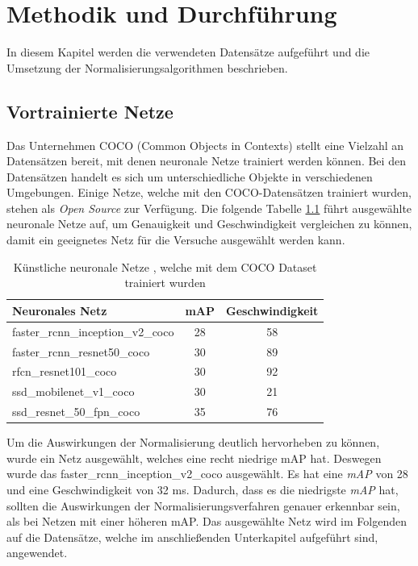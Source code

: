 \chapter{Methodik und Durchführung}\label{s.methudurchf}
In diesem Kapitel werden die verwendeten Datensätze aufgeführt und die Umsetzung der Normalisierungsalgorithmen beschrieben.  
 \section{Vortrainierte Netze}\label{s.modell}
Das Unternehmen COCO \cite{common2018data} (Common Objects in Contexts) stellt eine Vielzahl an Datensätzen bereit, mit denen neuronale Netze trainiert werden können. Bei den Datensätzen handelt es sich um unterschiedliche Objekte in verschiedenen Umgebungen.  
Einige Netze, welche mit den COCO-Datensätzen trainiert wurden, stehen als \textit{Open Source} zur Verfügung. Die folgende Tabelle \ref{tab:cocomodels} führt ausgewählte neuronale Netze auf, um Genauigkeit und Geschwindigkeit vergleichen zu können, damit ein geeignetes Netz für die Versuche ausgewählt werden kann.
\begin{table}
[h]
\caption{Künstliche neuronale Netze \cite{google2018tens}, welche mit dem COCO Dataset trainiert wurden \cite{common2018data}} 
\label{tab:cocomodels}
\centering
\begin{tabular}{|l|c|c|}
\hline
Neuronales Netz & mAP & Geschwindigkeit\\
\hline
faster\_rcnn\_inception\_v2\_coco & 28 & 58\\
faster\_rcnn\_resnet50\_coco & 30 & 89\\
rfcn\_resnet101\_coco & 30 & 92\\
ssd\_mobilenet\_v1\_coco & 30 & 21\\
ssd\_resnet\_50\_fpn\_coco & 35 & 76\\
\hline
\end{tabular}
\end{table}
Um die Auswirkungen der Normalisierung deutlich hervorheben zu können, wurde ein Netz ausgewählt, welches eine recht niedrige mAP hat. Deswegen wurde das faster\_rcnn\_inception\_v2\_coco ausgewählt. Es hat eine \textit{mAP} von 28 und eine Geschwindigkeit von 32 ms. Dadurch, dass es die niedrigste \textit{mAP} hat, sollten die Auswirkungen der Normalisierungsverfahren genauer erkennbar sein, als bei Netzen mit einer höheren mAP. Das ausgewählte Netz wird im Folgenden auf die Datensätze, welche im anschließenden Unterkapitel aufgeführt sind, angewendet.
